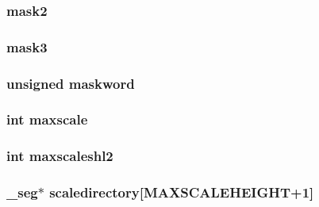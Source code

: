 \label{OLDSCALE_8C_a522ae19258cf30475ed90bb76819efb1}
\hypertarget{OLDSCALE_8C_adadec9ebf5f6fe80150d567aa14fb9df}{
\subsubsection[{mask2}]{ {\bf mask2}}}
\label{OLDSCALE_8C_adadec9ebf5f6fe80150d567aa14fb9df}
\hypertarget{OLDSCALE_8C_a2cf11bafb2cecc45d9388a79b54483b7}{
\subsubsection[{mask3}]{ {\bf mask3}}}
\label{OLDSCALE_8C_a2cf11bafb2cecc45d9388a79b54483b7}
\hypertarget{OLDSCALE_8C_a6ccb606fa584e073646279771b40a0ee}{
\subsubsection[{maskword}]{\setlength{\rightskip}{0pt plus 5cm}unsigned {\bf maskword}}}
\label{OLDSCALE_8C_a6ccb606fa584e073646279771b40a0ee}
\hypertarget{OLDSCALE_8C_a4531e3adda9a00231c5fc8b7a4644398}{
\subsubsection[{maxscale}]{\setlength{\rightskip}{0pt plus 5cm}int {\bf maxscale}}}
\label{OLDSCALE_8C_a4531e3adda9a00231c5fc8b7a4644398}
\hypertarget{OLDSCALE_8C_ac10b61c2a588ba00d9ecda54429e0a9d}{
\subsubsection[{maxscaleshl2}]{\setlength{\rightskip}{0pt plus 5cm}int {\bf maxscaleshl2}}}
\label{OLDSCALE_8C_ac10b61c2a588ba00d9ecda54429e0a9d}
\hypertarget{OLDSCALE_8C_a79aa20f0658411ee8fe8706f15753026}{
\subsubsection[{scaledirectory}]{ \_\-seg$\ast$ {\bf scaledirectory}\mbox{[}MAXSCALEHEIGHT+1\mbox{]}}}
